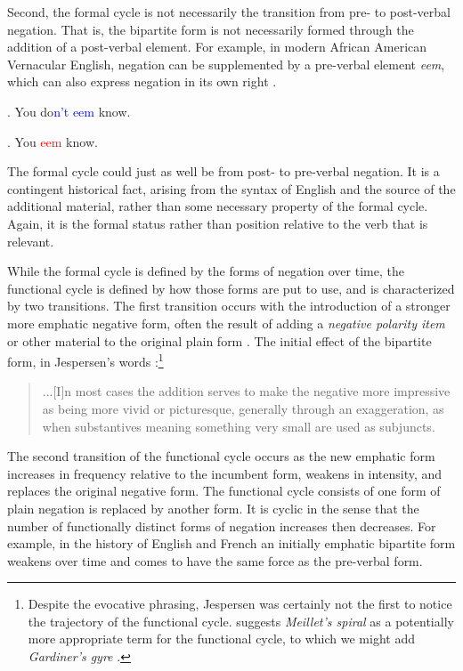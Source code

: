 \documentclass[linguex]{sp}
\theoremstyle{definition} \newtheorem{definition}{Definition}
\begin{document}
Second, the formal cycle is not necessarily the transition from pre- to post-verbal negation. That is, the bipartite form is not necessarily formed through the addition of a post-verbal element. For example, in modern African American Vernacular English, negation can be supplemented by a pre-verbal element \emph{eem}, which can also express negation in its own right \citep{jones2016, jones2015toward}.

\ex. You do\textcolor{blue}{n't eem} know.

\ex. You \textcolor{red}{eem} know.

The formal cycle could just as well be from post- to pre-verbal negation. It is a contingent historical fact, arising from the syntax of  English and the source of the additional material, rather than some necessary property of the formal cycle. Again, it is the formal status rather than position relative to the verb that is relevant.

While the formal cycle is defined by the forms of negation over time, the functional cycle is defined by how those forms are put to use, and is characterized by two transitions.  The first transition occurs with the introduction of a stronger more emphatic negative form, often the result of adding a \emph{negative polarity item} or other material to the original plain form \citep{horn:1989, givon1978, croft1991}. The initial effect of the bipartite form, in Jespersen's words \citeyearpar[15]{jespersen:1917}:\footnote{Despite the evocative phrasing, Jespersen was certainly not the first to notice the trajectory of the functional cycle. \cite{vanderAuwera2009} suggests \emph{Meillet's spiral} \citeyearpar[394]{meillet1912} as a potentially more appropriate term for the functional cycle, to which we might add \emph{Gardiner's gyre} \citeyearpar[134]{gardiner1904}.}

\begin{quotation}
...[I]n most cases the addition serves to make the negative more impressive as being more vivid or picturesque, generally through an exaggeration, as when substantives meaning something very small are used as subjuncts.
\end{quotation}

The second transition of the functional cycle occurs as the new emphatic form increases in frequency relative to the incumbent form, weakens in intensity, and replaces the original negative form. The functional cycle consists of one form of plain negation is replaced by another form. It is cyclic in the sense that the number of functionally distinct forms of negation increases then decreases. For example, in the history of English and French an initially emphatic bipartite form weakens over time and comes to have the same force as the pre-verbal form.
\end{document}
